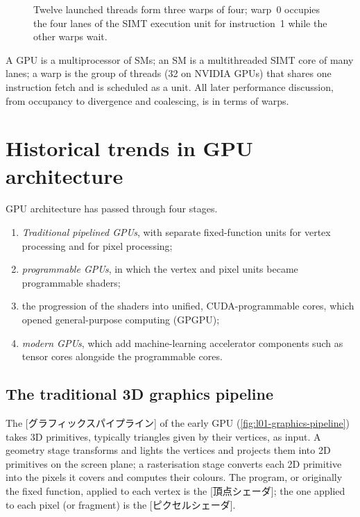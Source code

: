 \documentclass[../main.tex]{subfiles}
\begin{document}
\begin{figure}[htbp]
  \centering
  
  \caption{Twelve launched threads form three warps of four; warp~0
    occupies the four lanes of the SIMT execution unit for instruction~1
    while the other warps wait.}
  \label{fig:l01-warp-execution}
\end{figure}

\begin{keypoint}
  A GPU is a multiprocessor of SMs; an SM is a multithreaded SIMT core
  of many lanes; a warp is the group of threads (32 on NVIDIA GPUs) that
  shares one instruction fetch and is scheduled as a unit.  All
  later performance discussion, from occupancy to divergence and
  coalescing, is in terms of warps.
\end{keypoint}

\section{Historical trends in GPU architecture}
\label{sec:l01-history}

GPU architecture has passed through four stages.
\begin{enumerate}
  \item \emph{Traditional pipelined GPUs}, with separate fixed-function
    units for vertex processing and for pixel processing;
  \item \emph{programmable GPUs}, in which the vertex and pixel units
    became programmable shaders;
  \item the progression of the shaders into unified, CUDA-programmable
    cores, which opened general-purpose computing (GPGPU);
  \item \emph{modern GPUs}, which add machine-learning accelerator
    components such as tensor cores alongside the programmable cores.
\end{enumerate}

\subsection{The traditional 3D graphics pipeline}

The [グラフィックスパイプライン] of the early
GPU (\cref{fig:l01-graphics-pipeline}) takes 3D primitives, typically
triangles given by their vertices, as input.  A geometry stage transforms
and lights the vertices and projects them into 2D primitives on the
screen plane; a rasterisation stage converts each 2D primitive into the
pixels it covers and computes their colours.  The program, or originally
the fixed function, applied to each vertex is the
[頂点シェーダ]; the one applied to each pixel (or
fragment) is the [ピクセルシェーダ].
\end{document}
